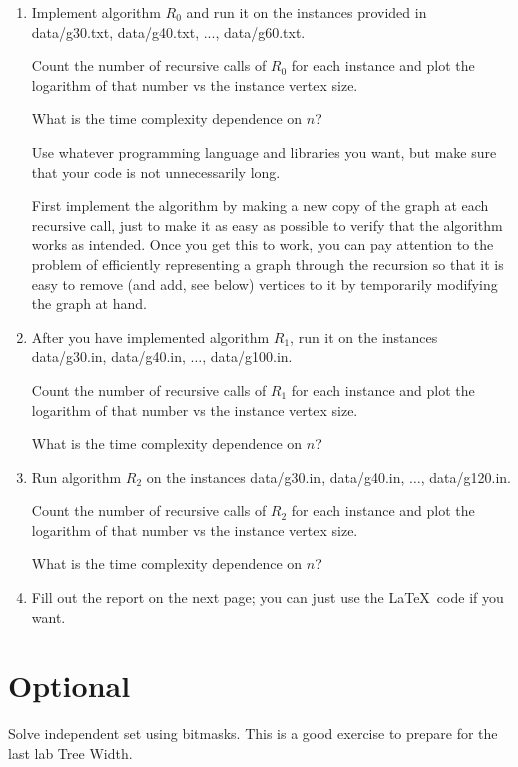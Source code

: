 \documentclass{tufte-handout}
\begin{document}
\begin{enumerate}
\item Implement algorithm $R_0$ and run it on the instances provided in
  data/g30.txt, data/g40.txt, ..., data/g60.txt.
  
  Count the number of recursive calls of $R_0$ for each instance and plot the
  logarithm of that number vs the instance vertex size. 
  
  What is the time complexity dependence on $n$?
  
  Use whatever programming language and libraries you want, but make
  sure that your code is not unnecessarily long.

  First implement the algorithm by making a new copy of the graph at
  each recursive call, just to make it as easy as possible to verify
  that the algorithm works as intended. Once you get this to work, you
  can pay attention to the problem of efficiently representing a graph
  through the recursion so that it is easy to remove (and add, see
  below) vertices to it by temporarily modifying the graph at hand.

\item After you have implemented algorithm $R_1$, run it on the instances
 data/g30.in, data/g40.in, $\ldots$, data/g100.in.

  Count the number of recursive calls of $R_1$ for each instance and plot the
  logarithm of that number vs the instance vertex size.
  
  What is the time complexity dependence on $n$?

\item Run algorithm $R_2$ on the instances data/g30.in, data/g40.in,
  $\ldots$, data/g120.in.

  Count the number of recursive calls of $R_2$ for each instance and plot the
  logarithm of that number vs the instance vertex size. 
  
  What is the time complexity dependence on $n$?

\item Fill out the report on the next page; you can just use the
  \LaTeX\ code if you want.
\end{enumerate}

\section{Optional}
Solve independent set using bitmasks. This is a good exercise to prepare for the last lab Tree Width.
\end{document}
